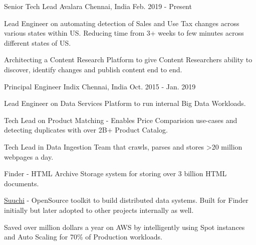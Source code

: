 

\begin{cventries}

  \cventry
    {Senior Tech Lead} %
    {Avalara} %
    {Chennai, India} %
    {Feb. 2019 - Present} %
    {
      \begin{cvitems} %
        \item {Lead Engineer on automating detection of Sales and Use Tax changes across various states within US. Reducing time from 3+ weeks to few minutes across different states of US. }
        \item {Architecting a Content Research Platform to give Content Researchers ability to discover, identify changes and publish content end to end. }
      \end{cvitems}
    }

  \cventry
    {Principal Engineer} %
    {Indix} %
    {Chennai, India} %
    {Oct. 2015 - Jan. 2019} %
    {
      \begin{cvitems} %
        \item {Lead Engineer on Data Services Platform to run internal Big Data Workloads. }
        \item {Tech Lead on Product Matching - Enables Price Comparision use-cases and detecting duplicates with over 2B+ Product Catalog. }
        \item {Tech Lead in Data Ingestion Team that crawls, parses and stores >20 million webpages a day. }
        \item {Finder - HTML Archive Storage system for storing over 3 billion HTML documents.}
        \item {\href{https://github.com/ashwanthkumar/suuchi}{Suuchi} - OpenSource toolkit to build distributed data systems. Built for Finder initially but later adopted to other projects internally as well. }
        \item {Saved over million dollars a year on AWS by intelligently using Spot instances and Auto Scaling for 70\% of Production workloads. }
      \end{cvitems}
    }


\end{cventries}
